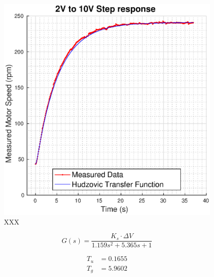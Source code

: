 \begin{figure}
    \centering
    \includegraphics[width=\linewidth]{images/hudzovic}
    \caption{XXX}
\end{figure}

\begin{equation}
    G(s) = \frac{K_s \cdot \Delta V}{1.159 s^2 + 5.365 s + 1}
\end{equation}

\begin{align}
    T_u  &= 0.1655 \\
    T_g  &= 5.9602
\end{align}

